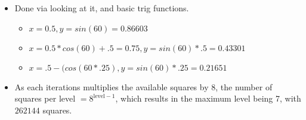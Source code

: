 
\begin{itemize}

\item Done via looking at it, and basic trig functions.
\begin{itemize}
\item $x=0.5,y=sin(60) = 0.86603$
\item $x=0.5*cos(60)+.5 = 0.75, y=sin(60)*.5=0.43301$
\item $x=.5-(cos(60*.25), y=sin(60)*.25 = 0.21651$
\end{itemize}

\item As each iterations multiplies the available squares by 8, the number of squares per level $= 8^{\text{level}-1}$, which results in the maximum level being 7, with $262144$ squares.

\end{itemize}

